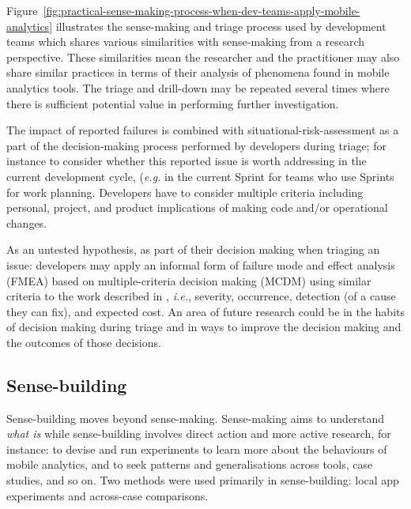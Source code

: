 Figure~\ref{fig:practical-sense-making-process-when-dev-teams-apply-mobile-analytics} illustrates the sense-making and triage process used by development teams which shares various similarities with sense-making from a research perspective. These similarities mean the researcher and the practitioner may also share similar practices in terms of their analysis of phenomena found in mobile analytics tools. The triage and drill-down may be repeated several times where there is sufficient potential value in performing further investigation. 

The impact of reported failures is combined with situational-risk-assessment as a part of the decision-making process performed by developers during triage; for instance to consider whether this reported issue is worth addressing in the current development cycle, (\textit{e.g.} in the current Sprint for teams who use Sprints for work planning. Developers have to consider multiple criteria including personal, project, and product implications of making code and/or operational changes.

As an untested hypothesis, as part of their decision making when triaging an issue: developers may apply an informal form of failure mode and effect analysis (FMEA) based on multiple-criteria decision making (MCDM) using similar criteria to the work described in \citealt{lo2018_novel_multi_criteria_decision_making_based_FMEA_model_for_risk_assessment}, \textit{i.e.}, severity, occurrence, detection (of a cause they can fix), and expected cost. An area of future research could be in the habits of decision making during triage and in ways to improve the decision making and the outcomes of those decisions.

\subsection{Sense-building}

Sense-building moves beyond sense-making. Sense-making aims to understand \textit{what is} while sense-building involves direct action and more active research, for instance: to devise and run experiments to learn more about the behaviours of mobile analytics, and to seek patterns and generalisations across tools, case studies, and so on. Two methods were used primarily in sense-building: local app experiments and across-case comparisons. 

